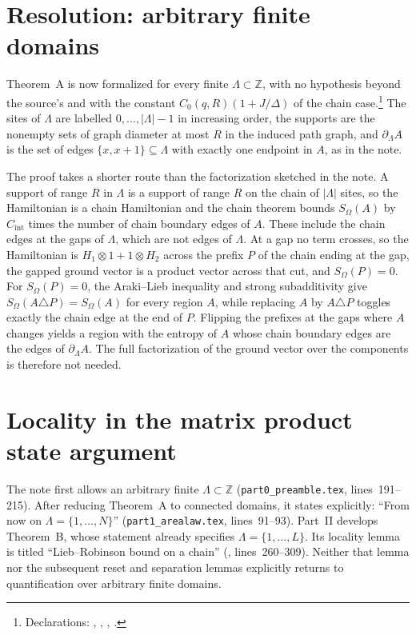 \documentclass{article}
\begin{document}
\section{Resolution: arbitrary finite domains}

Theorem~A is now formalized for every finite $\Lambda\subset\mathbb Z$, with
no hypothesis beyond the source's and with the constant
$C_0(q,R)(1+J/\Delta)$ of the chain case.\footnote{Declarations:
    ,
    ,
    ,
    .} The sites of $\Lambda$ are
labelled $0,\ldots,|\Lambda|-1$ in increasing order, the supports are the
nonempty sets of graph diameter at most $R$ in the induced path graph, and
$\partial_\Lambda A$ is the set of edges $\{x,x+1\}\subseteq\Lambda$ with
exactly one endpoint in $A$, as in the note.

The proof takes a shorter route than the factorization sketched in the note.
A support of range $R$ in $\Lambda$ is a support of range $R$ on the chain of
$|\Lambda|$ sites, so the Hamiltonian is a chain Hamiltonian and the chain
theorem bounds $S_\Omega(A)$ by $C_{\mathrm{int}}$ times the number of chain
boundary edges of $A$. These include the chain edges at the gaps of
$\Lambda$, which are not edges of $\Lambda$. At a gap no term crosses, so the
Hamiltonian is $H_1\otimes1+1\otimes H_2$ across the prefix $P$ of the chain
ending at the gap, the gapped ground vector is a product vector across that
cut, and $S_\Omega(P)=0$. For $S_\Omega(P)=0$, the Araki--Lieb inequality and
strong subadditivity give $S_\Omega(A\triangle P)=S_\Omega(A)$ for every
region $A$, while replacing $A$ by $A\triangle P$ toggles exactly the chain
edge at the end of $P$. Flipping the prefixes at the gaps where $A$ changes
yields a region with the entropy of $A$ whose chain boundary edges are the
edges of $\partial_\Lambda A$. The full factorization of the ground vector
over the components is therefore not needed.

\section{Locality in the matrix product state argument}

The note first allows an arbitrary finite $\Lambda\subset\mathbb Z$
(\texttt{part0\_preamble.tex}, lines~191--215). After reducing Theorem~A to
connected domains, it states explicitly: ``From now on
$\Lambda=\{1,\ldots,N\}$'' (\texttt{part1\_arealaw.tex}, lines~91--93).
Part~II develops Theorem~B, whose statement already specifies
$\Lambda=\{1,\ldots,L\}$. Its locality lemma is titled ``Lieb--Robinson
bound on a chain'' (, lines~260--309).
Neither that lemma nor the subsequent reset and separation lemmas explicitly
returns to quantification over arbitrary finite domains.
\end{document}
